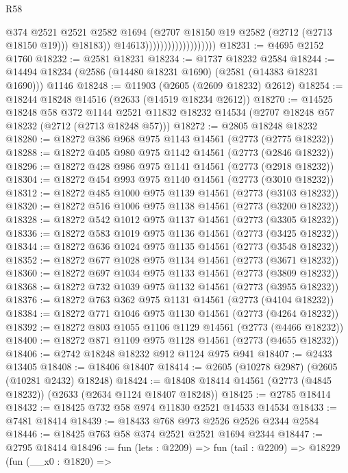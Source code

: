 \begin{lexlean}{R58}
\begin{coremodule}
                                              @374
                                              @2521
                                              @2521
                                              @2582
                                              @1694
                                              (@2707 @18150 @19 @2582 (@2712 (@2713 @18150 @19)))
                                              @18183))
                                          @14613)))))))))))))))))))
@18231 := @4695 @2152 @1760
@18232 := @2581 @18231
@18234 := @1737 @18232 @2584
@18244 := @14494 @18234 (@2586 (@14480 @18231 @1690) (@2581 (@14383 @18231 @1690))) @1146
@18248 := @11903 (@2605 (@2609 @18232) @2612)
@18254 := @18244 @18248 @14516 (@2633 (@14519 @18234 @2612))
@18270 := @14525
    @18248
    @58
    @372
    @1144
    @2521
    @11832
    @18232
    @14534
    (@2707 @18248 @57 @18232 (@2712 (@2713 @18248 @57)))
@18272 := @2805 @18248 @18232
@18280 := @18272 @386 @968 @975 @1143 @14561 (@2773 (@2775 @18232))
@18288 := @18272 @405 @980 @975 @1142 @14561 (@2773 (@2846 @18232))
@18296 := @18272 @428 @986 @975 @1141 @14561 (@2773 (@2918 @18232))
@18304 := @18272 @454 @993 @975 @1140 @14561 (@2773 (@3010 @18232))
@18312 := @18272 @485 @1000 @975 @1139 @14561 (@2773 (@3103 @18232))
@18320 := @18272 @516 @1006 @975 @1138 @14561 (@2773 (@3200 @18232))
@18328 := @18272 @542 @1012 @975 @1137 @14561 (@2773 (@3305 @18232))
@18336 := @18272 @583 @1019 @975 @1136 @14561 (@2773 (@3425 @18232))
@18344 := @18272 @636 @1024 @975 @1135 @14561 (@2773 (@3548 @18232))
@18352 := @18272 @677 @1028 @975 @1134 @14561 (@2773 (@3671 @18232))
@18360 := @18272 @697 @1034 @975 @1133 @14561 (@2773 (@3809 @18232))
@18368 := @18272 @732 @1039 @975 @1132 @14561 (@2773 (@3955 @18232))
@18376 := @18272 @763 @362 @975 @1131 @14561 (@2773 (@4104 @18232))
@18384 := @18272 @771 @1046 @975 @1130 @14561 (@2773 (@4264 @18232))
@18392 := @18272 @803 @1055 @1106 @1129 @14561 (@2773 (@4466 @18232))
@18400 := @18272 @871 @1109 @975 @1128 @14561 (@2773 (@4655 @18232))
@18406 := @2742 @18248 @18232 @912 @1124 @975 @941
@18407 := @2433 @13405
@18408 := @18406 @18407
@18414 := @2605 (@10278 @2987) (@2605 (@10281 @2432) @18248)
@18424 := @18408 @18414 @14561 (@2773 (@4845 @18232)) (@2633 (@2634 @1124 @18407 @18248))
@18425 := @2785 @18414
@18432 := @18425 @732 @58 @974 @11830 @2521 @14533 @14534
@18433 := @7481 @18414
@18439 := @18433 @768 @973 @2526 @2526 @2344 @2584
@18446 := @18425 @763 @58 @374 @2521 @2521 @1694 @2344
@18447 := @2795 @18414
@18496 := fun (lets : @2209) =>
  fun (tail : @2209) =>
  @18229
    (fun (__x0 : @1820) =>

\end{coremodule}
\end{lexlean}

